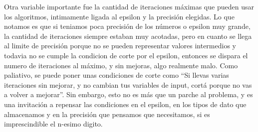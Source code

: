 Otra variable importante fue la cantidad de iteraciones m\'aximas que pueden 
usar los algoritmos, intimamente ligada al epsilon y la precisi\'on elegidas. 
Lo que notamos es que si teniamos poca precisi\'on de los n\'umeros o 
epsilon muy grande, la cantidad de iteraciones siempre estaban muy acotadas,
pero en cuanto se llega al limite de precisi\'on porque no se pueden representar
valores intermedios y todavia no se cumple la condicion de corte por el epsilon,
entonces se dispara el numero de iteraciones al m\'aximo, y sin mejoras, algo 
realmente malo. Como paliativo, se puede poner unas condiciones de corte como
``Si llevas varias iteraciones sin mejorar, y no cambian tus variables de input,
cort\'a porque no vas a volver a mejorar''. Sin embargo, esto no es m\'as que un
parche al problema, y es una invitaci\'on a repensar las condiciones en el
epsilon, en los tipos de dato que almacenamos y en la precisi\'on que pensamos
que necesitamos, si es imprescindible el n-esimo digito.

